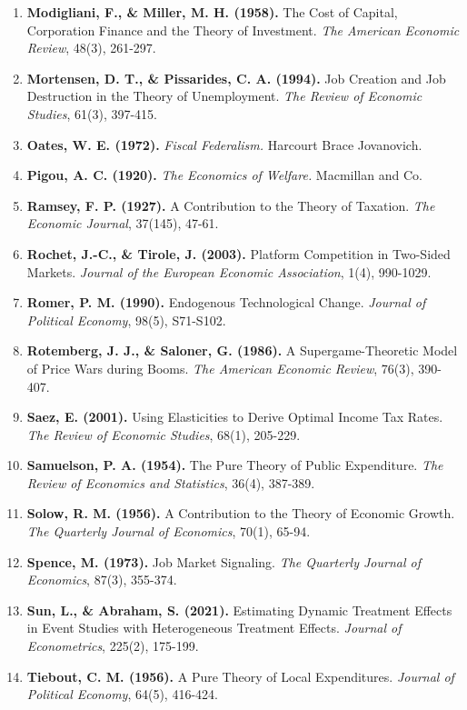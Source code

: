 \documentclass[
]{article}
\begin{document}
\begin{enumerate}
  Optimum Income Taxation. \emph{The Review of Economic Studies}, 38(2),
  175-208.
\item
  \textbf{Modigliani, F., \& Miller, M. H. (1958).} The Cost of Capital,
  Corporation Finance and the Theory of Investment. \emph{The American
  Economic Review}, 48(3), 261-297.
\item
  \textbf{Mortensen, D. T., \& Pissarides, C. A. (1994).} Job Creation
  and Job Destruction in the Theory of Unemployment. \emph{The Review of
  Economic Studies}, 61(3), 397-415.
\item
  \textbf{Oates, W. E. (1972).} \emph{Fiscal Federalism.} Harcourt Brace
  Jovanovich.
\item
  \textbf{Pigou, A. C. (1920).} \emph{The Economics of Welfare.}
  Macmillan and Co.
\item
  \textbf{Ramsey, F. P. (1927).} A Contribution to the Theory of
  Taxation. \emph{The Economic Journal}, 37(145), 47-61.
\item
  \textbf{Rochet, J.-C., \& Tirole, J. (2003).} Platform Competition in
  Two-Sided Markets. \emph{Journal of the European Economic
  Association}, 1(4), 990-1029.
\item
  \textbf{Romer, P. M. (1990).} Endogenous Technological Change.
  \emph{Journal of Political Economy}, 98(5), S71-S102.
\item
  \textbf{Rotemberg, J. J., \& Saloner, G. (1986).} A
  Supergame-Theoretic Model of Price Wars during Booms. \emph{The
  American Economic Review}, 76(3), 390-407.
\item
  \textbf{Saez, E. (2001).} Using Elasticities to Derive Optimal Income
  Tax Rates. \emph{The Review of Economic Studies}, 68(1), 205-229.
\item
  \textbf{Samuelson, P. A. (1954).} The Pure Theory of Public
  Expenditure. \emph{The Review of Economics and Statistics}, 36(4),
  387-389.
\item
  \textbf{Solow, R. M. (1956).} A Contribution to the Theory of Economic
  Growth. \emph{The Quarterly Journal of Economics}, 70(1), 65-94.
\item
  \textbf{Spence, M. (1973).} Job Market Signaling. \emph{The Quarterly
  Journal of Economics}, 87(3), 355-374.
\item
  \textbf{Sun, L., \& Abraham, S. (2021).} Estimating Dynamic Treatment
  Effects in Event Studies with Heterogeneous Treatment Effects.
  \emph{Journal of Econometrics}, 225(2), 175-199.
\item
  \textbf{Tiebout, C. M. (1956).} A Pure Theory of Local Expenditures.
  \emph{Journal of Political Economy}, 64(5), 416-424.
\end{enumerate}
\end{document}
